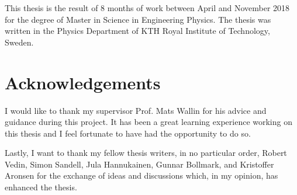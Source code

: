 This thesis is the result of 8 months of work between April and November 2018 for the degree of Master in Science in Engineering Physics. The thesis was written in the Physics Department of KTH Royal Institute of Technology, Sweden.

\section*{Acknowledgements}

I would like to thank my supervisor Prof. Mats Wallin for his advice and guidance during this project. It has been a great learning experience working on this thesis and I feel fortunate to have had the opportunity to do so.

Lastly, I want to thank my fellow thesis writers, in no particular order, Robert Vedin, Simon Sandell, Jula Hannukainen, Gunnar Bollmark, and Kristoffer Aronsen for the exchange of ideas and discussions which, in my opinion, has enhanced the thesis.